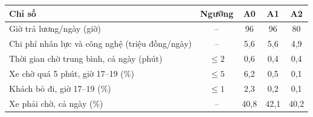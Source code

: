 \begin{tabular}{@{}lcccc@{}}
\toprule
Chỉ số & Ngưỡng & A0 & A1 & A2 \\
\midrule
Giờ trả lương/ngày (giờ) & -- & 96 & 96 & 80 \\
Chi phí nhân lực và công nghệ (triệu đồng/ngày) & -- & 5{,}6 & 5{,}6 & 4{,}9 \\
Thời gian chờ trung bình, cả ngày (phút) & $\le 2$ & 0{,}6 & 0{,}4 & 0{,}4 \\
Xe chờ quá 5 phút, giờ 17--19 (\%) & $\le 5$ & 6{,}2 & 0{,}5 & 0{,}1 \\
Khách bỏ đi, giờ 17--19 (\%) & $\le 1$ & 2{,}3 & 0{,}2 & 0{,}1 \\
Xe phải chờ, cả ngày (\%) & -- & 40{,}8 & 42{,}1 & 40{,}2 \\
\bottomrule
\end{tabular}
